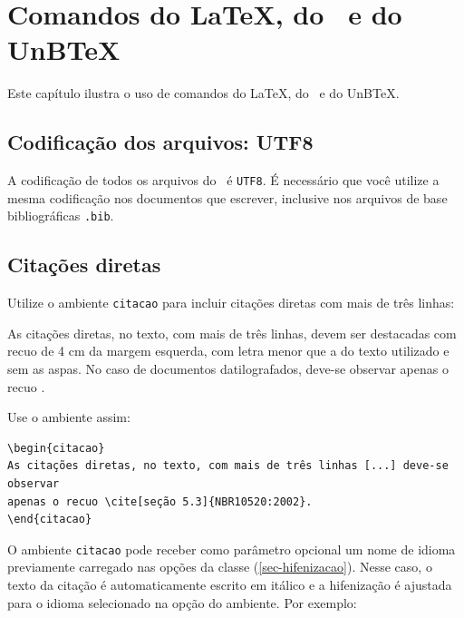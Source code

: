 \chapter{Comandos do \LaTeX, do \abnTeX\ e do UnB\TeX}
\label{cap_exemplos}

Este capítulo ilustra o uso de comandos do \LaTeX, do \abnTeX\ e do UnB\TeX. 

\section{Codificação dos arquivos: UTF8}

A codificação de todos os arquivos do \abnTeX\ é \texttt{UTF8}. É necessário que você utilize a mesma codificação nos documentos que escrever, inclusive nos arquivos de base bibliográficas \verb|.bib|.

\section{Citações diretas}\label{sec-citacao}

Utilize o ambiente \texttt{citacao} para incluir citações diretas com mais de três linhas:

\begin{citacao}
As citações diretas, no texto, com mais de três linhas, devem ser destacadas com recuo de 4 cm da margem esquerda, com letra menor que a do texto utilizado e sem as aspas. No caso de documentos datilografados, deve-se observar apenas o recuo \cite[seção 5.3]{NBR10520:2002}.
\end{citacao}

Use o ambiente assim:

\begin{verbatim}
\begin{citacao}
As citações diretas, no texto, com mais de três linhas [...] deve-se observar
apenas o recuo \cite[seção 5.3]{NBR10520:2002}.
\end{citacao}
\end{verbatim}

O ambiente \texttt{citacao} pode receber como parâmetro opcional um nome de idioma previamente carregado nas opções da classe (\autoref{sec-hifenizacao}). Nesse caso, o texto da citação é automaticamente escrito em itálico e a hifenização é ajustada para o idioma selecionado na opção do ambiente. Por exemplo:

